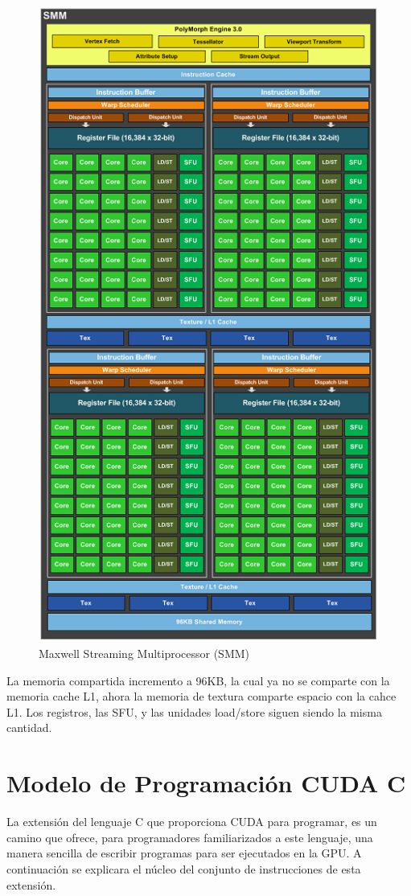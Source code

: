 \begin{figure}[ph]
			\centering
				\includegraphics[scale=0.6]{img/MaxwellSM.png}
			\caption{Maxwell Streaming Multiprocessor (SMM) \cite{Maxwell}}
\end{figure}

La memoria compartida incremento a 96KB, la cual ya no se comparte con la memoria cache L1, ahora la memoria de textura comparte espacio con la cahce L1. Los registros, las SFU, y las unidades load/store siguen siendo la misma cantidad.\pagebreak






\section{Modelo de Programación CUDA C}
La extensión del lenguaje C que proporciona CUDA para programar, es un camino que ofrece, para programadores familiarizados a este lenguaje, una manera sencilla de escribir programas para ser ejecutados en la GPU. A continuación se explicara el núcleo del conjunto de instrucciones de esta extensión.

